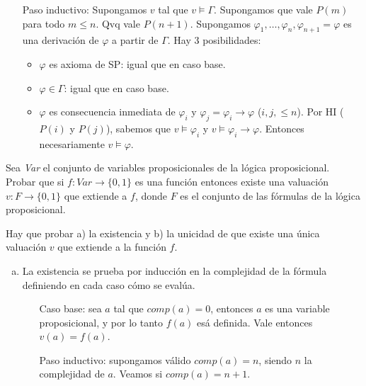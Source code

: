 \begin{questions}
\begin{solution}
\begin{enumerate}[\quad]
  \item[Paso inductivo:] Supongamos $v$ tal que $v\vDash\Gamma$. Supongamos que vale $P(m)$ para todo $m\leq n$. Qvq vale $P(n+1)$. Supongamos $\varphi_1, \dots, \varphi_n,\varphi_{n+1}=\varphi$ es una derivaci\'on de $\varphi$ a partir de $\Gamma$. Hay 3 posibilidades: 
  \begin{itemize}
   \item $\varphi$ es axioma de SP: igual que en caso base. 
   \item $\varphi\in\Gamma$: igual que en caso base.
   \item $\varphi$ es consecuencia inmediata de $\varphi_i$ y $\varphi_j=\varphi_i\rightarrow\varphi$ ($i,j,\leq n$). Por HI ($P(i)$ y $P(j)$), sabemos que $v\vDash\varphi_i$ y $v\vDash\varphi_i\rightarrow\varphi$. Entonces necesariamente $v\vDash\varphi$.  
  \end{itemize}

 \end{enumerate}

\end{solution}

\question Sea {\it Var} el conjunto de variables proposicionales de la l\'ogica proposicional. Probar que si $f : Var \rightarrow \{0,1\}$ es una funci\'on entonces existe una valuaci\'on $v: F \rightarrow \{0,1\}$ que extiende a $f$, donde $F$ es el conjunto de las f\'ormulas de la l\'ogica proposicional. 


\begin{solution}
 

Hay que probar a) la existencia y b) la unicidad de que existe una \'unica valuaci\'on $v$ que extiende a la funci\'on $f$. 

\begin{enumerate}[a)]
 \item La existencia se prueba por inducci\'on en la complejidad de la f\'ormula definiendo en cada caso c\'omo se eval\'ua. 
  
  \begin{enumerate}[\quad]
  \item[Caso base:] sea $a$ tal que $comp(a) = 0$, entonces $a$ es una variable proposicional, y por lo tanto $f(a)$ es\'a definida. Vale entonces $v(a) = f(a)$. 
  
  \item[Paso inductivo:] supongamos v\'alido $comp(a) = n$, siendo $n$ la complejidad de $a$. Veamos si $comp(a) = n+1$. 
    

\end{enumerate}
\end{enumerate}
\end{solution}
\end{questions}
